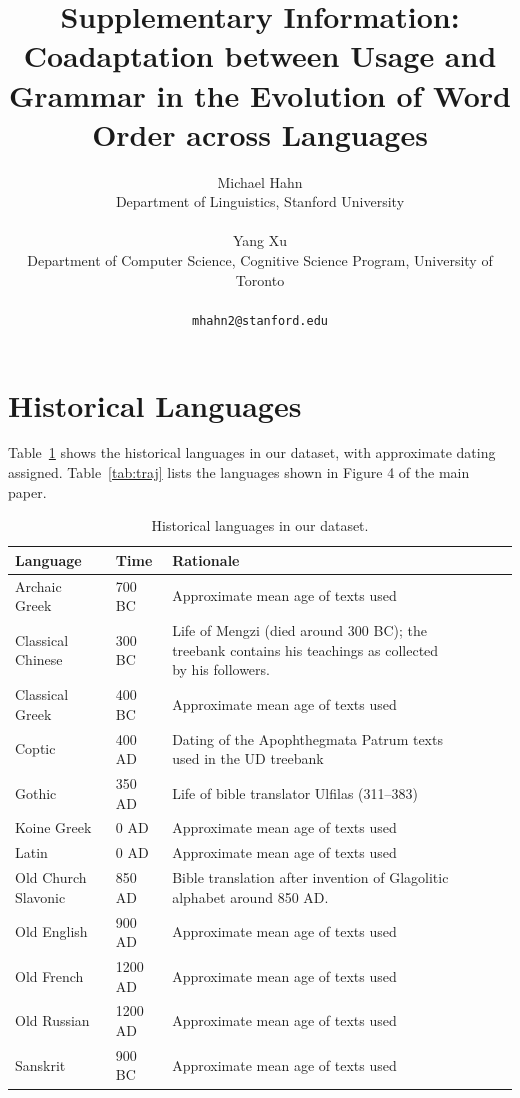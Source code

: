 \documentclass[11pt,a4paper]{article}
\title{Supplementary Information: Coadaptation between Usage and Grammar in the Evolution of
Word Order across Languages}
\author{Michael Hahn\\Department of Linguistics, Stanford University\\\\Yang Xu\\ Department of Computer Science, Cognitive Science Program, University of Toronto\\\\ \texttt{mhahn2@stanford.edu}}
\date{}
\begin{document}
\maketitle

\tableofcontents

\section{Historical Languages}

Table~\ref{tab:historical} shows the historical languages in our dataset, with approximate dating assigned.
Table~\ref{tab:traj} lists the languages shown in Figure 4 of the main paper.

\begin{table}
\begin{longtable}{llp{10cm}llll}
Language & Time & Rationale \\ \hline
Archaic Greek & 700 BC & Approximate mean age of texts used \\
Classical Chinese & 300 BC & Life of Mengzi (died around 300 BC); the treebank contains his teachings as collected by his followers. \\
Classical Greek & 400 BC & Approximate mean age of texts used \\
Coptic & 400 AD & Dating of the Apophthegmata Patrum texts used in the UD treebank\\
Gothic & 350 AD & Life of bible translator Ulfilas (311--383)\\
Koine Greek & 0 AD  & Approximate mean age of texts used\\
Latin & 0 AD & Approximate mean age of texts used \\
Old Church Slavonic & 850 AD &  Bible translation after invention of Glagolitic alphabet around 850 AD. \\
Old English & 900 AD & Approximate mean age of texts used \\
Old French & 1200 AD  & Approximate mean age of texts used\\
Old Russian & 1200 AD & Approximate mean age of texts used\\
Sanskrit & 900 BC & Approximate mean age of texts used \\
\end{longtable}
	\caption{Historical languages in our dataset.}\label{tab:historical}
\end{table}
\end{document}
